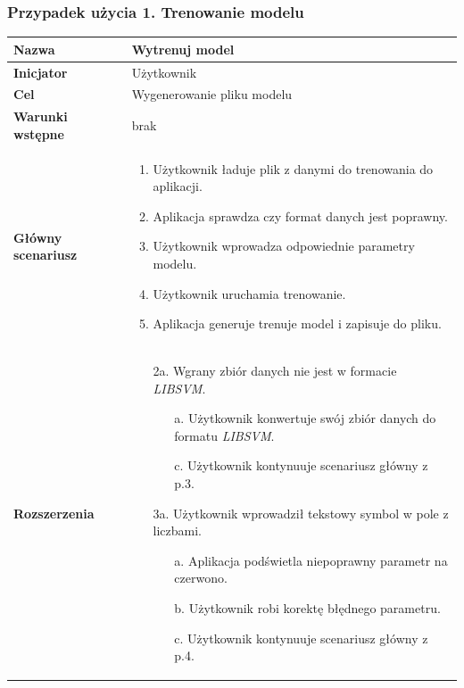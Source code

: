 \documentclass[paper=a4, fontsize=11pt]{scrartcl} %
\numberwithin{equation}{section} %
\numberwithin{figure}{section} %
\begin{document}
\subsubsection{Przypadek użycia 1. Trenowanie modelu}

\begin{tabular}{|l|l|}  \hline
    \textbf{Nazwa} & Wytrenuj model \\\hline
    \textbf{Inicjator} & Użytkownik \\\hline
    \textbf{Cel} & Wygenerowanie pliku modelu \\\hline
    \textbf{Warunki wstępne} & brak\\\hline
    \textbf{Główny scenariusz} & 
    \begin{minipage}{5in}
        \vskip 4pt
        \begin{enumerate}
            \item Użytkownik ładuje plik z danymi do trenowania do aplikacji.
            \item Aplikacja sprawdza czy format danych jest poprawny.
            \item Użytkownik wprowadza odpowiednie parametry modelu.
            \item Użytkownik uruchamia trenowanie.
            \item Aplikacja generuje trenuje model i zapisuje do pliku.
        \end{enumerate}
        \vskip 4pt
    \end{minipage}
    \\\hline

    \textbf{Rozszerzenia} & 
    \begin{minipage}{5in}
        \vskip 4pt
        \begin{itemize}
            \item[2a.] Wgrany zbiór danych nie jest w formacie \textit{LIBSVM}.
                \begin{itemize}
                    \item[a.] Użytkownik konwertuje swój zbiór danych do formatu \textit{LIBSVM}.
                    \item[c.] Użytkownik kontynuuje scenariusz główny z p.3.
                \end{itemize}
            \item[3a.] Użytkownik wprowadził tekstowy symbol w pole z liczbami.
                \begin{itemize}
                    \item[a.] Aplikacja podświetla niepoprawny parametr na czerwono.
                    \item[b.] Użytkownik robi korektę błędnego parametru.
                    \item[c.] Użytkownik kontynuuje scenariusz główny z p.4.
                \end{itemize}
        \end{itemize}
        \vskip 4pt
    \end{minipage}
    \\\hline
\end{tabular}
\end{document}
